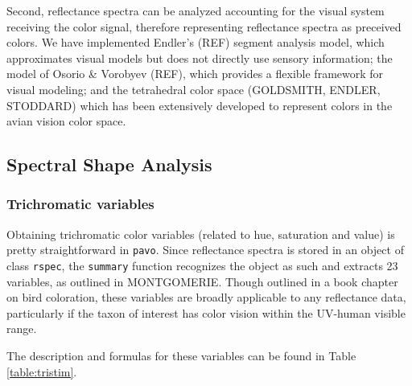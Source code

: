 \documentclass{article}
\newcommand{\pavo}{{\tt pavo}}  %
\newcommand{\code}[1]{{\tt #1}}  %
\begin{document}
Second, reflectance spectra can be analyzed accounting for the visual system receiving the color 
signal, therefore representing reflectance spectra as preceived colors. We have implemented 
Endler's (REF) segment analysis model, which approximates visual models but does not directly 
use sensory information; the model of Osorio \& Vorobyev (REF), which provides a flexible 
framework for visual modeling; and the tetrahedral color space (GOLDSMITH, ENDLER, STODDARD) 
which has been extensively developed to represent colors in the avian vision color space.

\subsection{Spectral Shape Analysis}

\subsubsection{Trichromatic variables}

Obtaining trichromatic color variables (related to hue, saturation and value) is pretty
straightforward in \pavo{}. Since reflectance spectra is stored in an object of class 
\code{rspec}, the \code{summary} function recognizes the object as such and extracts 23 
variables, as outlined in MONTGOMERIE. Though outlined in a book chapter on bird coloration, 
these variables are broadly applicable to any reflectance data, particularly if the taxon of 
interest has color vision within the UV-human visible range.

The description and formulas for these variables can be found in Table \ref{table:tristim}.
\end{document}
